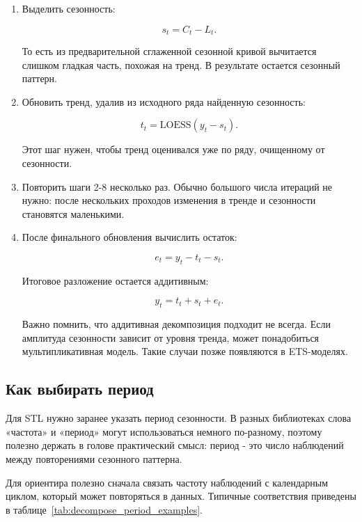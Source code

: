 \documentclass[12pt,fleqn]{article}
\begin{document}
\begin{enumerate}
Точная техническая реализация может отличаться между библиотеками.
Интуитивно \(L_t\) - это очень гладкая часть \(C_t\), которую не хочется считать сезонностью.

  \item Выделить сезонность:

\[
s_t=C_t-L_t.
\]

То есть из предварительной сглаженной сезонной кривой вычитается слишком гладкая часть, похожая на тренд.
В результате остается сезонный паттерн.

  \item Обновить тренд, удалив из исходного ряда найденную сезонность:

\[
t_t
=
\mathrm{LOESS}\left(y_t-s_t\right).
\]

Этот шаг нужен, чтобы тренд оценивался уже по ряду, очищенному от сезонности.

  \item Повторить шаги 2-8 несколько раз.
  Обычно большого числа итераций не нужно: после нескольких проходов изменения в тренде и сезонности становятся маленькими.

  \item После финального обновления вычислить остаток:

\[
e_t
=
y_t-t_t-s_t.
\]

Итоговое разложение остается аддитивным:

\[
y_t
=
t_t+s_t+e_t.
\]

Важно помнить, что аддитивная декомпозиция подходит не всегда.
Если амплитуда сезонности зависит от уровня тренда, может понадобиться мультипликативная модель.
Такие случаи позже появляются в ETS-моделях.

\end{enumerate}

\subsection{Как выбирать период}


Для STL нужно заранее указать период сезонности.
В разных библиотеках слова «частота» и «период» могут использоваться немного по-разному, поэтому полезно держать в голове практический смысл: период - это число наблюдений между повторениями сезонного паттерна.

Для ориентира полезно сначала связать частоту наблюдений с календарным циклом, который может повторяться в данных.
Типичные соответствия приведены в таблице~\ref{tab:decompose_period_examples}.
\end{document}
